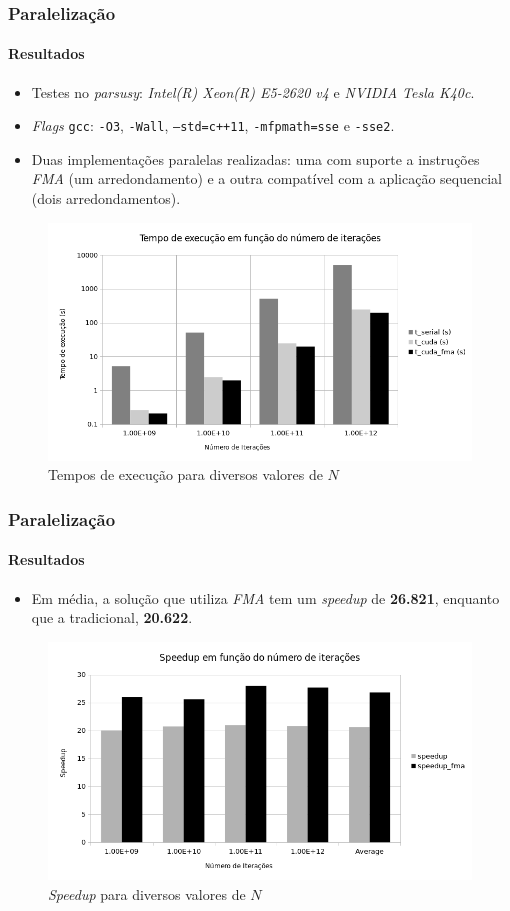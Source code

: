 \documentclass[10pt]{beamer}
\begin{document}
\begin{frame}
\frametitle{Paralelização}
\framesubtitle{Resultados}

\begin{itemize}
  \item Testes no \textit{parsusy}: \textit{Intel(R) Xeon(R) E5-2620 v4} e
  \textit{NVIDIA Tesla K40c}.
  \item \textit{Flags} \texttt{gcc}: \texttt{-O3}, \texttt{-Wall},
  \texttt{--std=c++11}, \texttt{-mfpmath=sse} e \texttt{-sse2}.
  \item Duas implementações paralelas realizadas: uma com suporte a instruções
  \textit{FMA} (um arredondamento) e a outra compatível com a aplicação
  sequencial (dois arredondamentos).
\end{itemize}

\begin{figure}
  \centering
  \includegraphics[width=0.55\linewidth]{img/time}
  \caption{Tempos de execução para diversos valores de \(N\)}
  \label{fig:time}
\end{figure}

\end{frame}

\begin{frame}
\frametitle{Paralelização}
\framesubtitle{Resultados}


\begin{itemize}
  \item Em média, a solução que utiliza \textit{FMA} tem um
\textit{speedup} de \textbf{26.821}, enquanto que a tradicional,
\textbf{20.622}.
\end{itemize}

\begin{figure}
  \centering
  \includegraphics[width=0.70\linewidth]{img/speedup}
  \caption{\textit{Speedup} para diversos valores de \(N\)}
  \label{fig:speedup}
\end{figure}

\end{frame}
\end{document}

